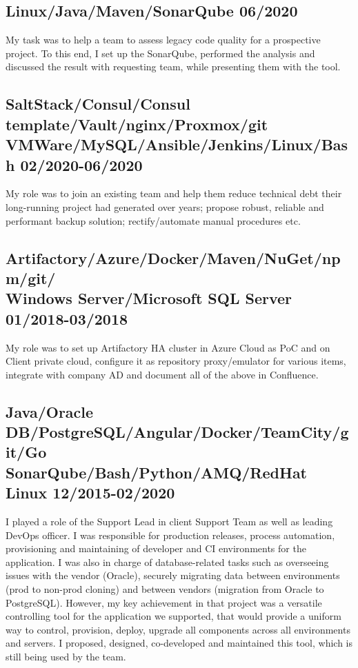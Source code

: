 \documentclass[%
               doublesided,
               paper=a4,
               fontsize=10pt
              ]{my-resume}
\begin{document}
{    \subsection{Linux/Java/Maven/SonarQube {\small 06/2020}}
    My task was to help a team to assess legacy code quality for a prospective
    project.  To this end, I set up the SonarQube, performed the analysis and
    discussed the result with requesting team, while presenting them with the tool.
    \vspace{0.5em}
    
    \subsection{SaltStack/Consul/Consul template/Vault/nginx/Proxmox/git\\
    VMWare/MySQL/Ansible/Jenkins/Linux/Bash {\small 02/2020-06/2020}}
    My role was to join an existing team and help them reduce technical debt
    their long-running project had generated over years; propose robust,
    reliable and performant backup solution; rectify/automate manual procedures etc.
    \vspace{0.5em}
        
    \subsection{Artifactory/Azure/Docker/Maven/NuGet/npm/git/\\
    Windows Server/Microsoft SQL Server {\small 01/2018-03/2018}}
    My role was to set up Artifactory HA cluster in Azure Cloud as PoC and on Client
    private cloud, configure it as repository proxy/emulator for various items,
    integrate with company AD and document all of the above in Confluence.
    \vspace{0.5em}
    
    \subsection{Java/Oracle DB/PostgreSQL/Angular/Docker/TeamCity/git/Go\\
    SonarQube/Bash/Python/AMQ/RedHat Linux {\small 12/2015-02/2020}}
    I played a role of the Support Lead in client Support Team as well as leading
    DevOps officer.  I was responsible for production releases, process automation,
    provisioning and maintaining of developer and CI environments for the
    application.  I was also in charge of database-related tasks such as overseeing
    issues with the vendor (Oracle), securely migrating data between
    environments (prod to non-prod cloning) and between vendors (migration from
    Oracle to PostgreSQL).  However, my key achievement in that project was a
    versatile controlling tool for the application we supported, that would provide
    a uniform way to control, provision, deploy, upgrade all components across all
    environments and servers.  I proposed, designed, co-developed and maintained
    this tool, which is still being used by the team.
    \vspace{0.5em}
    
}
\end{document}
